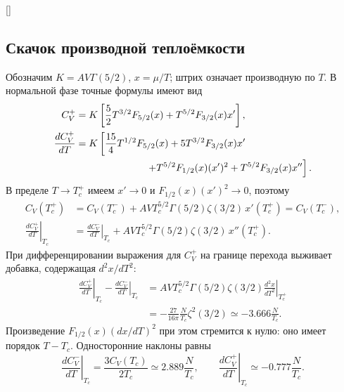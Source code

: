 \documentclass[../final.tex]{subfiles}
\begin{document}
\begin{rbox}[unbreakable,left=18pt,right=18pt,top=14pt,bottom=10pt]{[]}
\centering
\captionsetup{font=footnotesize,hypcap=false,skip=7pt}
\end{rbox}

\clearpage
\subsection{Скачок производной теплоёмкости}
Обозначим
$K=AV\Gamma(5/2)$, $x=\mu/T$; штрих означает производную по $T$.
В нормальной фазе точные формулы имеют вид
\begin{align*}
 C_V^+&=K\left[\frac52T^{3/2}F_{5/2}(x)
 +T^{5/2}F_{3/2}(x)x'\right],\\
 \frac{dC_V^+}{dT}
 &=K\left[\frac{15}{4}T^{1/2}F_{5/2}(x)
 +5T^{3/2}F_{3/2}(x)x'\right.\\
 &\hspace{2.5cm}\left.
 +T^{5/2}F_{1/2}(x)(x')^2
 +T^{5/2}F_{3/2}(x)x''\right].
\end{align*}
В пределе $T\to T_c^+$ имеем $x'\to0$ и
$F_{1/2}(x)(x')^2\to0$, поэтому
\begin{align*}
 C_V(T_c^+)&=C_V(T_c^-)
 +AVT_c^{5/2}\Gamma(5/2)\zeta(3/2)\,x'(T_c^+)
 =C_V(T_c^-),\\
 \left.\frac{dC_V^+}{dT}\right|_{T_c}
 &=\left.\frac{dC_V^-}{dT}\right|_{T_c}
 +AVT_c^{5/2}\Gamma(5/2)\zeta(3/2)\,x''(T_c^+).
\end{align*}
При дифференцировании выражения для $C_V^+$ на границе перехода
выживает добавка, содержащая $d^2x/dT^2$:
\begin{align*}
 \left.\frac{dC_V^+}{dT}\right|_{T_c}
 -\left.\frac{dC_V^-}{dT}\right|_{T_c}
 &=AVT_c^{5/2}\Gamma(5/2)\zeta(3/2)
 \left.\frac{d^2x}{dT^2}\right|_{T_c^+}\\
 &=-\frac{27}{16\pi}\frac{N}{T_c}\zeta^2(3/2)
 \simeq-3.666\frac{N}{T_c}.
\end{align*}
Произведение $F_{1/2}(x)(dx/dT)^2$ при этом стремится к нулю:
оно имеет порядок $T-T_c$. Односторонние наклоны равны
\begin{equation*}
 \left.\frac{dC_V^-}{dT}\right|_{T_c}
 =\frac{3C_V(T_c)}{2T_c}\simeq2.889\frac{N}{T_c},\qquad
 \left.\frac{dC_V^+}{dT}\right|_{T_c}\simeq-0.777\frac{N}{T_c}.
\end{equation*}
\end{document}

